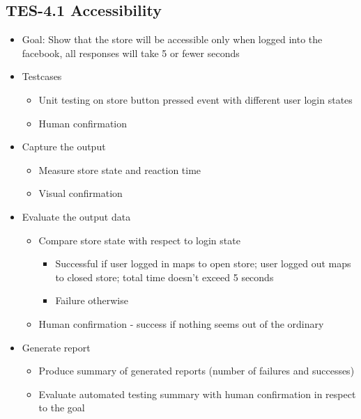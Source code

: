\subsection{TES-4.1 Accessibility}
\begin{itemize}
\item Goal: Show that the store will be accessible only when logged into the facebook, all responses will take 5 or fewer seconds

\item Testcases
\begin{itemize}
\item Unit testing on store button pressed event with different user login states
\item Human confirmation
\end{itemize}

\item Capture the output
\begin{itemize}
\item Measure store state and reaction time
\item Visual confirmation
\end{itemize}

\item Evaluate the output data
\begin{itemize}
\item Compare store state with respect to login state
\begin{itemize}
\item Successful if user logged in maps to open store; user logged out maps to closed store; total time doesn’t exceed 5 seconds
\item Failure otherwise
\end{itemize}
\item Human confirmation - success if nothing seems out of the ordinary
\end{itemize}

\item Generate report
\begin{itemize}
\item Produce summary of generated reports (number of failures and successes)
\item Evaluate automated testing summary with human confirmation in respect to the goal
\end{itemize}
\end{itemize}


